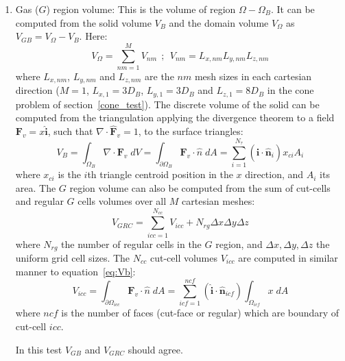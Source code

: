 \documentclass[11pt]{book}
\begin{document}
\begin{enumerate}
    \item Gas ($G$) region volume:
    This is the volume of region $\Omega-\Omega_B$. It can be computed from the solid volume $V_B$ and the domain volume $V_\Omega$ as $V_{GB}=V_\Omega-V_B$. Here:
    \begin{equation}
       V_\Omega=\sum_{nm=1}^M {V_{nm}} \: \: ; \: \: V_{nm}=L_{x,nm} L_{y,nm} L_{z,nm}
    \end{equation}
    where $L_{x,nm}$, $L_{y,nm}$ and $L_{z,nm}$ are the $nm$ mesh sizes in each cartesian direction ($M=1$, $L_{x,1}=3D_B$, $L_{y,1}=3D_B$ and $L_{z,1}=8D_B$ in the cone problem of section~\ref{cone_test}). The discrete volume of the solid can be computed from the triangulation applying the divergence theorem to a field $\mathbf{F}_v=x \mathbf{\hat{i}}$, such that $\nabla \cdot \mathbf{\hat{F}}_v=1$, to the surface triangles:
    \begin{equation}
      V_B = \int_{\Omega _{B}} \nabla \cdot \mathbf{F}_v \; dV =
      \int_{\partial \Omega _{B}}  \mathbf{F}_v \cdot \hat{n} \; dA =
      \sum_{i=1}^{N_\tau}{(\mathbf{\hat{i}} \cdot \mathbf{\hat{n}}_i) x_{ci} A_i}
      \label{eq:Vb}
    \end{equation}
    where $x_{ci}$ is the $i$th triangle centroid position in the $x$ direction, and $A_i$ its area.
    The $G$ region volume can also be computed from the sum of cut-cells and regular $G$ cells volumes over all $M$ cartesian meshes:
    \begin{equation}
       V_{GRC} = \sum_{icc=1}^{N_{cc}}{V_{icc}} + N_{rg} \Delta x \Delta y \Delta z
       \label{}
    \end{equation}
    where $N_{rg}$ the number of regular cells in the $G$ region, and $\Delta x,\Delta y,\Delta z$ the uniform grid cell sizes. The  $N_{cc}$ cut-cell volumes $V_{icc}$ are computed in similar manner to equation~\eqref{eq:Vb}:
    \begin{equation}
    V_{icc} = \int_{\partial \Omega _{icc}}  \mathbf{F}_v \cdot \hat{n} \; dA =
    \sum_{icf=1}^{ncf} (\mathbf{\hat{i}} \cdot \mathbf{\hat{n}}_{icf}) \int_{\Omega _{icf}} x \; dA
    \label{eq:vol2}
    \end{equation}
    where $ncf$ is the number of faces (cut-face or regular) which are boundary of cut-cell $icc$.

    In this test $V_{GB}$ and $V_{GRC}$ should agree.
    \newline


\end{enumerate}
\end{document}
